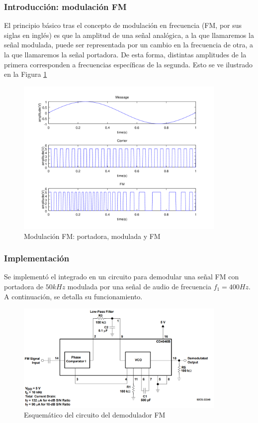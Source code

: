 \subsubsection{Introducción: modulación FM}
El principio básico tras el concepto de modulación en frecuencia (FM, por sus siglas en inglés) es que la amplitud de una señal analógica, a la que llamaremos la señal modulada, puede ser representada por un cambio en la frecuencia de otra, a la que llamaremos la señal portadora. De esta forma, distintas amplitudes de la primera corresponden a frecuencias específicas de la segunda. Esto se ve ilustrado en la Figura \ref{modulacionfmsenales}
\begin{figure}[H]
    \centering
    \includegraphics[width=0.9\textwidth]{../Ex2/resources/modulacionfmsenales.png}
    \caption{Modulación FM: portadora, modulada y FM}
    \label{modulacionfmsenales}
\end{figure}

\subsubsection{Implementación}
Se implementó el integrado en un circuito para demodular una señal FM con portadora de $50kHz$ modulada por una señal de audio de frecuencia $f_{1}=400Hz$. A continuación, se detalla su funcionamiento.
\begin{figure}[H]
    \centering
    \includegraphics[width=0.9\textwidth]{../Ex2/resources/demoduladorfmconexion.png}
    \caption{Esquemático del circuito del demodulador FM}
    \label{demoduladorfmconexion}
\end{figure}


